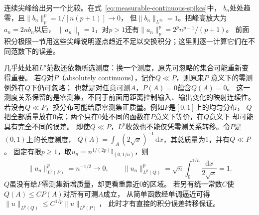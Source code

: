 连续尖峰给出另一个比较。在式~\eqref{eq:measurable-continuous-spikes}中，
$b_n$处处趋零，且$\lVert b_n\rVert_p^p=1/[n(p+1)]\to0$，
但$\lVert b_n\rVert_{L^\infty}=1$。把峰高放大为$a_n=2nb_n$以后，
$\lVert a_n\rVert_1=1$，对$p>1$还有$\lVert a_n\rVert_p^p=2^pn^{p-1}/(p+1)$。
前面积分极限一节用这些尖峰说明逐点趋近不足以交换积分；这里则逐一计算它们在不同范数下的误差。

几乎处处和$L^p$范数还依赖所选测度：换一个测度，原先可忽略的集合可能重新变得重要。
若$Q$对$P$（absolutely continuous），记作$Q\ll P$，则原来$P$
意义下的零测例外在$Q$下仍可忽略；
也就是对任意可测$A$，$P(A)=0$蕴含$Q(A)=0$。
这一测度关系保留的是零测集，不同于前面用距离控制输入、输出变化的映射连续性。
若没有$Q\ll P$，换分布可能给原零测集正质量。例如$P$是$[0,1]$上的均匀分布，
$Q$把全部质量放在$0$点；两个只在$0$处不同的函数在$P$意义下等价，在$Q$意义下
却可能具有完全不同的误差。
即使$Q\ll P$，$L^p$收敛也不能仅凭零测关系转移。令$P$是$(0,1)$上的长度测度，
$Q(A)=\int_A(2\sqrt x)^{-1}\,\mathrm dx$，其总质量为$1$，并有$Q\ll P$。
固定有限$p\geq1$，取$u_n=n^{1/(2p)}\mathbb I_{(0,1/n)}$，则
\[
 \lVert u_n\rVert_{L^p(P)}^p=n^{-1/2}\to0,\qquad
 \lVert u_n\rVert_{L^p(Q)}^p
 =\sqrt n\int_0^{1/n}\frac{\mathrm dx}{2\sqrt x}=1.
\]
$Q$虽没有给$P$零测集新增质量，却更看重靠近$0$的区域。
若另有统一常数$C$使$Q(A)\leq CP(A)$对所有可测$A$成立，
从简单函数经单调逼近可得$\lVert u\rVert_{L^p(Q)}
\leq C^{1/p}\lVert u\rVert_{L^p(P)}$，
此时才有直接的积分误差转移保证。
